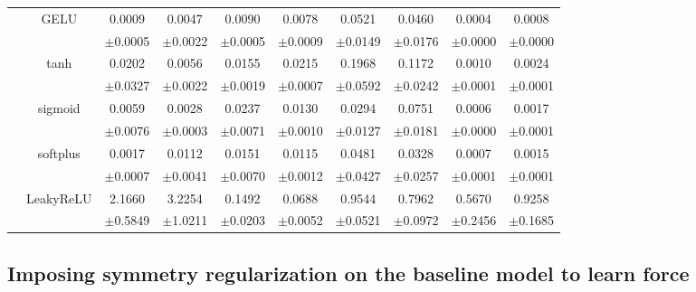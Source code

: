 \documentclass{article}
\newcommand{\abs}[1]{\lvert #1 \rvert}
\begin{document}
\begin{longtable}[h!]{cccccccccc}
        & \multirow{2}{*}{GELU}
        &0.0009 & 0.0047 & 0.0090 & 0.0078 & 0.0521 & 0.0460 & 0.0004 & 0.0008\\
        &&\scriptsize $\pm$0.0005&\scriptsize$\pm$0.0022&\scriptsize$\pm$0.0005&\scriptsize$\pm$0.0009&\scriptsize$\pm$0.0149&\scriptsize$\pm$0.0176&\scriptsize$\pm$0.0000&\scriptsize$\pm$0.0000\\
        \cline{3-10}\rule{0pt}{2.3ex}

        & \multirow{2}{*}{tanh}
        &0.0202 & 0.0056 & 0.0155 & 0.0215 & 0.1968 & 0.1172 & 0.0010 & 0.0024\\
        &&\scriptsize $\pm$0.0327&\scriptsize$\pm$0.0022&\scriptsize$\pm$0.0019&\scriptsize$\pm$0.0007&\scriptsize$\pm$0.0592&\scriptsize$\pm$0.0242&\scriptsize$\pm$0.0001&\scriptsize$\pm$0.0001\\
        \cline{3-10}\rule{0pt}{2.3ex}


        & \multirow{2}{*}{sigmoid}
        &0.0059 & 0.0028 & 0.0237 & 0.0130 & 0.0294 & 0.0751 & 0.0006 & 0.0017\\
        &&\scriptsize $\pm$0.0076&\scriptsize$\pm$0.0003&\scriptsize$\pm$0.0071&\scriptsize$\pm$0.0010&\scriptsize$\pm$0.0127&\scriptsize$\pm$0.0181&\scriptsize$\pm$0.0000&\scriptsize$\pm$0.0001\\
        \cline{3-10}\rule{0pt}{2.3ex}

        & \multirow{2}{*}{softplus}
        &0.0017 & 0.0112 & 0.0151 & 0.0115 & 0.0481 & 0.0328 & 0.0007 & 0.0015\\
        &&\scriptsize $\pm$0.0007&\scriptsize$\pm$0.0041&\scriptsize$\pm$0.0070&\scriptsize$\pm$0.0012&\scriptsize$\pm$0.0427&\scriptsize$\pm$0.0257&\scriptsize$\pm$0.0001&\scriptsize$\pm$0.0001\\
        \cline{3-10}\rule{0pt}{2.3ex}

        & \multirow{2}{*}{LeakyReLU}
        &2.1660 & 3.2254 & 0.1492 & 0.0688 & 0.9544 & 0.7962 & 0.5670 & 0.9258\\
        &&\scriptsize $\pm$0.5849&\scriptsize$\pm$1.0211&\scriptsize$\pm$0.0203&\scriptsize$\pm$0.0052&\scriptsize$\pm$0.0521&\scriptsize$\pm$0.0972&\scriptsize$\pm$0.2456&\scriptsize$\pm$0.1685\\
        
      \bottomrule

\end{longtable}
\clearpage


\subsection{Imposing symmetry regularization on the baseline model to learn force}
\label{sec:symmetry_for_baseline}
\end{document}
